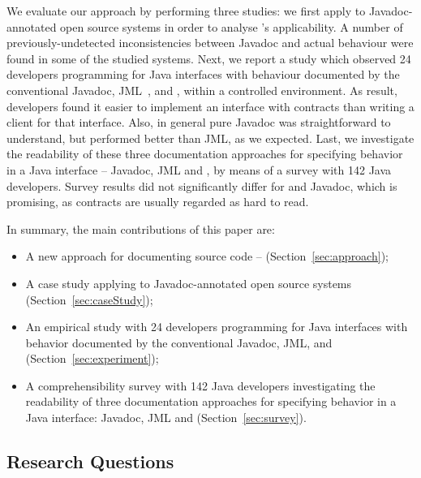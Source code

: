 We evaluate our approach by performing three studies:
we first apply \contractjdoc{} to \totalSystems{} Javadoc-annotated open source
systems in order to analyse \contractjdoc{}'s applicability.
A number of previously-undetected inconsistencies between Javadoc and actual behaviour were found in some of the studied systems.
Next, we report a study which observed 24 developers programming for Java interfaces with behaviour
documented by the conventional Javadoc, JML~\cite{jml}, and
\contractjdoc{}, within a controlled environment.
As result, developers found it easier to implement an interface with contracts
than writing a client for that interface. Also, in general pure Javadoc was straightforward to understand, but \contractjdoc{} performed better than JML, as we expected.
Last, we investigate the readability of these three documentation approaches
for specifying behavior in a Java interface -- Javadoc, JML and \contractjdoc{}, by
means of a survey with 142 Java developers.
Survey results did not significantly differ for \contractjdoc{} and Javadoc, which
is promising, as contracts are usually regarded as hard to read.

In summary, the main contributions of this paper are:
\begin{itemize}
\item A new approach for documenting source code -- \contractjdoc{} (Section~\ref{sec:approach});
\item A case study applying \contractjdoc{} to \totalSystems{} Javadoc-annotated open source
systems (Section~\ref{sec:caseStudy});
\item An empirical study with 24 developers programming for Java interfaces with behavior
documented by the conventional Javadoc, JML, and \contractjdoc{} (Section~\ref{sec:experiment});
\item A comprehensibility survey with 142 Java developers investigating the
readability of three documentation approaches for specifying behavior in a Java
interface: Javadoc, JML and \contractjdoc{} (Section~\ref{sec:survey}).
\end{itemize}


\subsection{Research Questions}
\label{sec:researchQuestions}

